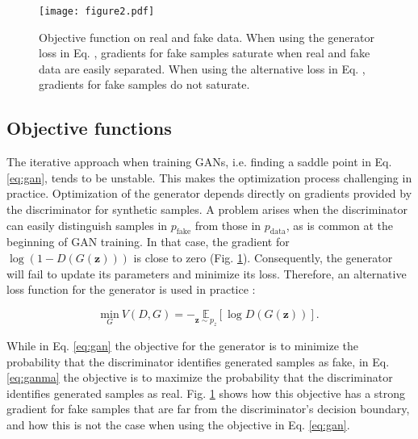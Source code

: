 \documentclass{article}
\begin{document}
\begin{figure}
\centering
\texttt{[image: figure2.pdf]}
\caption{Objective function on real and fake data. When using the generator loss in Eq. \protect{\ref{eq:gan}}, gradients for fake samples saturate when real and fake data are easily separated. When using the alternative loss in Eq. \protect{\ref{eq:ganma}}, gradients for fake samples do not saturate.}
\label{fig:objectives}
\end{figure}


\subsection{Objective functions}
\label{sec:objectives}
The iterative approach when training GANs, i.e. finding a saddle point in Eq. \ref{eq:gan}, tends to be unstable. This makes the optimization process challenging in practice. %
Optimization of the generator depends directly on gradients provided by the discriminator for synthetic samples. A problem arises when the discriminator can easily distinguish samples in $p_{\text{fake}}$ from those in $p_{\text{data}}$, as is common at the beginning of GAN training. In that case, the gradient for $\log{(1-D(G(\mathbf{z})))}$ is close to zero (Fig. \ref{fig:objectives}). Consequently, the generator will fail to update its parameters and minimize its loss. Therefore, an alternative loss function for the generator is used in practice \cite{Good14}:

\begin{equation}
\underset{G}{\text{min}}~V(D,G)=-\underset{\mathbf{z}\sim p_z}{\mathds{E}} [\log{D(G(\mathbf{z}))}].
\label{eq:ganma}
\end{equation}

While in Eq. \ref{eq:gan} the objective for the generator is to minimize the probability that the discriminator identifies generated samples as fake, in Eq. \ref{eq:ganma} the objective is to maximize the probability that the discriminator identifies generated samples as real. Fig. \ref{fig:objectives} shows how this objective has a strong gradient for fake samples that are far from the discriminator's decision boundary, and how this is not the case when using the objective in Eq. \ref{eq:gan}.
\end{document}

